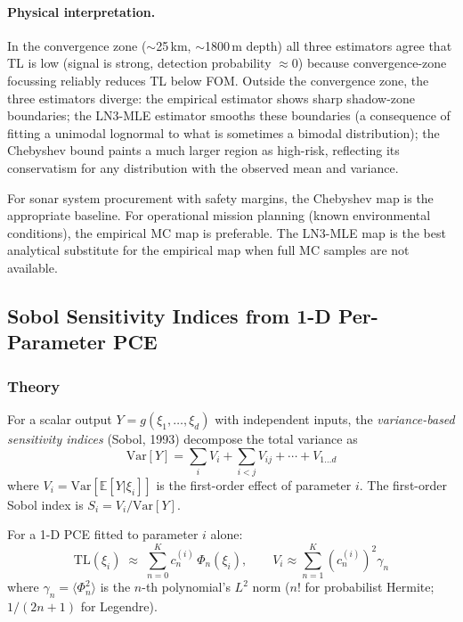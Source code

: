 \documentclass[11pt,a4paper]{article}
\newcommand{\EX}{\mathbb{E}}
\newcommand{\Var}{\mathrm{Var}}
\newcommand{\TL}{\mathrm{TL}}
\begin{document}
\paragraph{Physical interpretation.}
In the convergence zone ($\sim$25\,km, $\sim$1800\,m depth) all three estimators agree
that TL is low (signal is strong, detection probability $\approx$0) because convergence-zone
focussing reliably reduces TL below FOM.
Outside the convergence zone, the three estimators diverge:
the empirical estimator shows sharp shadow-zone boundaries;
the LN3-MLE estimator smooths these boundaries (a consequence of fitting a unimodal
lognormal to what is sometimes a bimodal distribution);
the Chebyshev bound paints a much larger region as high-risk, reflecting its
conservatism for any distribution with the observed mean and variance.

For sonar system procurement with safety margins, the Chebyshev map is the appropriate
baseline.
For operational mission planning (known environmental conditions), the empirical MC map
is preferable.
The LN3-MLE map is the best analytical substitute for the empirical map when full MC
samples are not available.

\subsection{Sobol Sensitivity Indices from 1-D Per-Parameter PCE}
\label{sec:sobol}

\subsubsection{Theory}

For a scalar output $Y = g(\xi_1,\ldots,\xi_d)$ with independent inputs, the
\emph{variance-based sensitivity indices} (Sobol, 1993) decompose the total variance as
\begin{equation}
  \Var[Y] = \sum_i V_i + \sum_{i<j} V_{ij} + \cdots + V_{1\ldots d}
\end{equation}
where $V_i = \Var[\EX[Y|\xi_i]]$ is the first-order effect of parameter $i$.
The first-order Sobol index is $S_i = V_i / \Var[Y]$.

For a 1-D PCE fitted to parameter $i$ alone:
\begin{equation}
  \TL(\xi_i) \;\approx\; \sum_{n=0}^K c_n^{(i)}\,\Phi_n(\xi_i),
  \qquad
  V_i \approx \sum_{n=1}^K \left(c_n^{(i)}\right)^2 \gamma_n
\end{equation}
where $\gamma_n = \langle\Phi_n^2\rangle$ is the $n$-th polynomial's $L^2$ norm
($n!$ for probabilist Hermite; $1/(2n+1)$ for Legendre).
\end{document}
